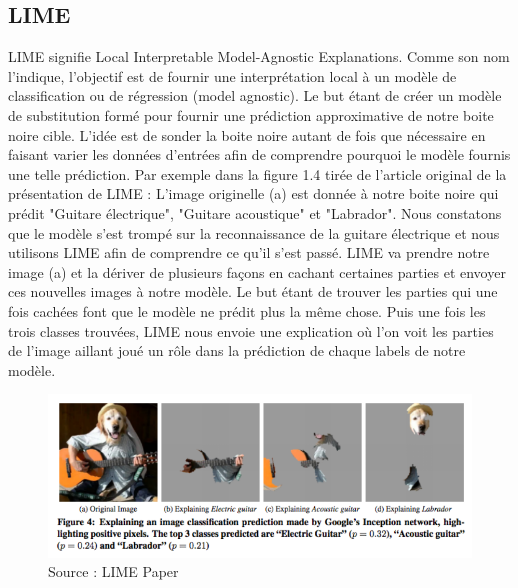 \subsection{LIME}
LIME signifie Local Interpretable Model-Agnostic Explanations. Comme son nom l'indique, l'objectif est de fournir une interprétation local à un modèle de classification ou de régression (model agnostic). Le but étant de créer un modèle de substitution formé pour fournir une prédiction approximative de notre boite noire cible. L'idée est de sonder la boite noire autant de fois que nécessaire en faisant varier les données d'entrées afin de comprendre pourquoi le modèle fournis une telle prédiction. Par exemple dans la figure 1.4 tirée de l'article original de la présentation de LIME\cite{limePaper} : L'image originelle (a) est donnée à notre boite noire qui prédit "Guitare électrique", "Guitare acoustique" et "Labrador". Nous constatons que le modèle s'est trompé sur la reconnaissance de la guitare électrique et nous utilisons LIME afin de comprendre ce qu'il s'est passé. LIME va prendre notre image (a) et la dériver de plusieurs façons en cachant certaines parties et envoyer ces nouvelles images à notre modèle. Le but étant de trouver les parties qui une fois cachées font que le modèle ne prédit plus la même chose. Puis une fois les trois classes trouvées, LIME nous envoie une explication où l'on voit les parties de l'image aillant joué un rôle dans la prédiction de chaque labels de notre modèle.
\begin{figure}[h]
\centering
\includegraphics[scale=0.35]{src_img/limeExemple.png}
\caption{Source : LIME Paper}
\label{limeExemple}
\end{figure}

